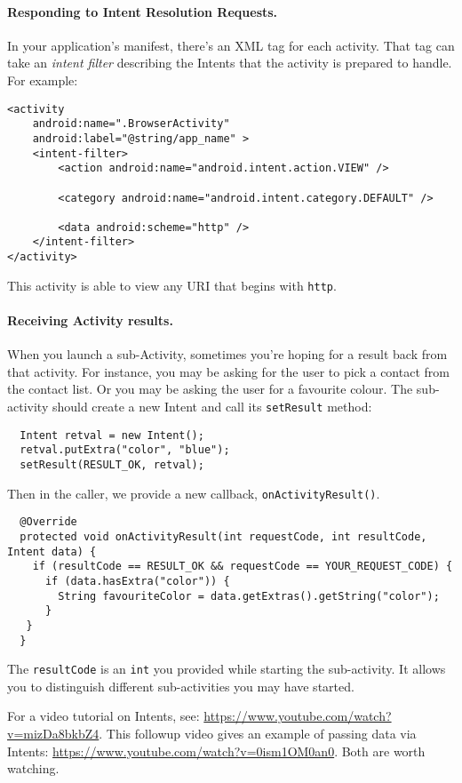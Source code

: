 \paragraph{Responding to Intent Resolution Requests.}
In your application's manifest, there's an XML tag for each activity.
That tag can take an \emph{intent filter} describing the Intents
that the activity is prepared to handle. For example:
{ 
\begin{verbatim}
<activity
    android:name=".BrowserActivity"
    android:label="@string/app_name" >
    <intent-filter>
        <action android:name="android.intent.action.VIEW" />

        <category android:name="android.intent.category.DEFAULT" />

        <data android:scheme="http" />
    </intent-filter>
</activity>
\end{verbatim}
}
This activity is able to view any URI that begins with {\tt http}.

\paragraph{Receiving Activity results.}
When you launch a sub-Activity, sometimes you're hoping for a result
back from that activity. For instance, you may be asking for the
user to pick a contact from the contact list. Or you may be asking the
user for a favourite colour. The sub-activity should
create a new Intent and call its {\tt setResult} method:

{ 
\begin{verbatim}
  Intent retval = new Intent();
  retval.putExtra("color", "blue");
  setResult(RESULT_OK, retval);
\end{verbatim}
}

Then in the caller, we provide a new callback, {\tt onActivityResult()}.

{
\begin{verbatim}
  @Override
  protected void onActivityResult(int requestCode, int resultCode, Intent data) {
    if (resultCode == RESULT_OK && requestCode == YOUR_REQUEST_CODE) {
      if (data.hasExtra("color")) {
        String favouriteColor = data.getExtras().getString("color");
      }
   }
  }
\end{verbatim}
}

The {\tt resultCode} is an {\tt int} you provided while starting the
sub-activity. It allows you to distinguish different sub-activities you
may have started.

For a video tutorial on Intents, see:
 \url{https://www.youtube.com/watch?v=mizDa8bkbZ4}. This followup video gives an example of passing data via Intents:
\url{https://www.youtube.com/watch?v=0ism1OM0an0}. Both are worth watching.




